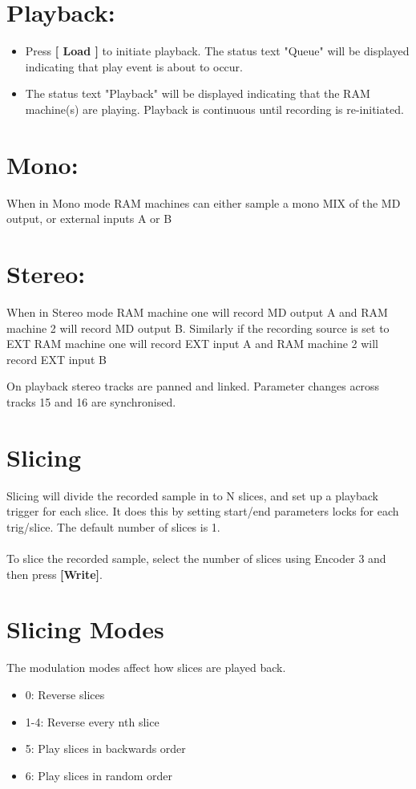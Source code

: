 \section{Playback:}
\begin{itemize}
\item Press \textbf{[ Load ]} to initiate playback. The status text "Queue" will be displayed indicating that play event is about to occur. 
\item The status text "Playback" will be displayed indicating that the RAM machine(s) are playing. Playback is continuous until recording is re-initiated. 
\end{itemize}


\section{Mono:}
When in Mono mode RAM machines can either sample a mono MIX of the MD output, or external inputs A or B
\section{Stereo:}
When in Stereo mode RAM machine one will record MD output A and RAM machine 2 will record MD output B. Similarly if the recording source is set to EXT RAM machine one will record EXT input A and RAM machine 2 will record EXT input B

On playback stereo tracks are panned and linked. Parameter changes across tracks 15 and 16 are synchronised.
\newpage
\section{Slicing}
Slicing will divide the recorded sample in to N slices, and set up a playback trigger for each slice. It does this by setting start/end parameters locks for each trig/slice. The default number of slices is 1.\\
\\
To slice the recorded sample, select the number of slices using Encoder 3 and then press \textbf{[Write]}.
\\

\section{Slicing Modes}

The modulation modes affect how slices are played back.
\begin{itemize}
    \item 0: Reverse slices
    \item 1-4: Reverse every nth slice
    \item 5: Play slices in backwards order
    \item 6: Play slices in random order
\end{itemize}



